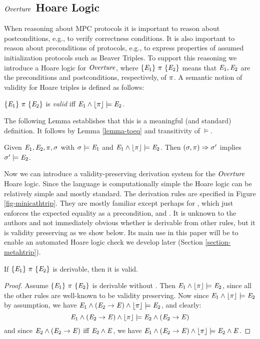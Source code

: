 \subsection{$\mathit{Overture}$ Hoare Logic}

When reasoning about MPC protocols it is important to reason about
postconditions, e.g., to verify correctness conditions. It is also
important to reason about preconditions of protocols, e.g., to express
properties of assumed initialization protocols such as Beaver Triples.
To support this reasoning we introduce a Hoare logic for $\mathit{Overture}$,
where $\{ \mathit{E}_1 \}\ \pi\ \{ \mathit{E}_2 \}$ means that $\mathit{E}_1,\mathit{E}_2$ are
the preconditions and postconditions, respectively, of $\pi$.
A semantic notion of validity for Hoare triples is defined as
follows:

\minicathtripfig

\begin{definition}
$\{ \mathit{E}_1 \}\ \pi\ \{ \mathit{E}_2 \}$ is \emph{valid} iff $\mathit{E}_1 \wedge \lfloor \pi \rfloor \models \mathit{E}_2$.
\end{definition}

The following Lemma establishes that this is a meaningful (and
standard) definition. It follows by Lemma \ref{lemma-toeq}
and transitivity of $\models$.
\begin{lemma}
  \label{lemma-hoare}
  Given $\mathit{E}_1, \mathit{E}_2, \pi, \sigma$ with $\sigma \models \mathit{E}_1$
  and $\mathit{E}_1 \wedge \lfloor \pi \rfloor \models \mathit{E}_2$. Then
  $(\sigma,\pi) \Rightarrow \sigma'$ implies $\sigma' \models
  \mathit{E}_2$.
\end{lemma}

Now we can introduce a validity-preserving derivation system for the
$\mathit{Overture}$ Hoare logic. Since the language is computationally simple
the Hoare logic can be relatively simple and mostly standard.
The derivation rules are specified in Figure \ref{fig-minicathtrip}.
They are mostly familiar except perhaps for , which
just enforces the expected equality as a precondition, and
. It is unknown to the authors and not immediately
obvious whether  is derivable from other rules, but
it is validity preserving as we show below. Its main use in this
paper will be to enable an automated Hoare logic check we develop
later (Section \ref{section-metahtrip}).
\begin{lemma}
  If $\{ \mathit{E}_1 \}\ \pi\ \{ \mathit{E}_2 \}$ is derivable, then it is valid.
\end{lemma}

\begin{proof}
  Assume $\{ \mathit{E}_1 \}\ \pi\ \{ \mathit{E}_2 \}$ is derivable without .
  Then $\mathit{E}_1 \wedge \lfloor \pi \rfloor \models \mathit{E}_2$, since all the other rules
  are well-known to be validity preserving. 
  Now since $\mathit{E}_1 \wedge \lfloor \pi \rfloor \models \mathit{E}_2$ by assumption, we have
  $
  \mathit{E}_1 \wedge (\mathit{E}_2 \rightarrow \mathit{E}) \wedge \lfloor \pi \rfloor \models \mathit{E}_2 
  $,
  and clearly:
  $$
  \mathit{E}_1 \wedge (\mathit{E}_2 \rightarrow \mathit{E}) \wedge \lfloor \pi \rfloor \models \mathit{E}_2 \wedge (\mathit{E}_2 \rightarrow \mathit{E})
  $$
  and since $\mathit{E}_2 \wedge (\mathit{E}_2 \rightarrow \mathit{E})$ iff
  $\mathit{E}_2 \wedge \mathit{E}$, we have
  $\mathit{E}_1 \wedge (\mathit{E}_2 \rightarrow \mathit{E}) \wedge \lfloor \pi \rfloor \models \mathit{E}_2 \wedge \mathit{E}$.
\end{proof}

